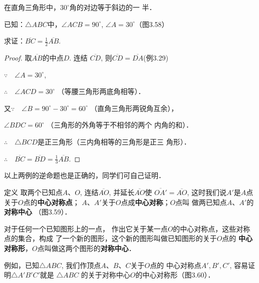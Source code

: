 \begin{example}
    在直角三角形中，$30^{\circ}$角的对边等于斜边的一
半．
\end{example}

已知：$\triangle ABC$中，$\angle ACB=90^{\circ}$, $\angle A=30^{\circ}$（图3.58）

求证：$\overline{BC}=\frac{1}{2}\overline{AB}$.

\begin{proof}
    取$\overline{AB}$的中点$D$. 连结
    $\overline{CD}$, 则$\overline{CD}=\overline{DA}$(例3.29)

$\because\quad \angle A=30^{\circ}$,

$\therefore\quad \angle ACD=30^{\circ}$ （等腰三角形两底角相等）．

又$\because\quad \angle B=90^{\circ} -30^{\circ} =60^{\circ}$ （直角三角形两锐角互余），

$ \angle BDC=60^{\circ}$ （三角形的外角等于不相邻的两个
    内角的和）．

$\therefore\quad \triangle BCD$是正三角形（三内角相等的三角形是正三
    角形）．

$\therefore\quad  \overline{BC}= \overline{BD}=\frac{1}{3} \overline{AB}$.
 \end{proof}

以上两例的逆命题也是正确的，同学们可自己证明．   
    
\begin{blk}
   {定义} 取两个已知点$A$、$O$, 连结$\overline{AO}$, 并延长$\overline{AO}$使
$\overline{OA'}=\overline{AO}$, 这时我们说$A'$是$A$点关于$O$点的\textbf{中心对称点}；
$A$、$A'$关于$O$点成\textbf{中心对称}；$O$点叫
做两已知点$A$、$A'$的\textbf{对称中心}
（图3.59）． 
\end{blk}

\begin{figure}[htp]
    \centering
    \caption{}
\end{figure}

对于任何一个已知图形上的一点，
作出它关于某一点$O$的中心对称点，这些对称点的集合，构成
了一个新的图形，这个新的图形叫做已知图形的关于$O$点的
\textbf{中心对称形}，$O$点叫做这两个图形的\textbf{对称中心}．

例如，已知$\triangle ABC$, 我们作顶点$A$、$B$、$C$关于$O$点的
中心对称点$A',B',C'$, 容易证明$\triangle A'B'C'$就是
$\triangle ABC$
的关于对称中心$O$的中心对称形（图3.60）．

